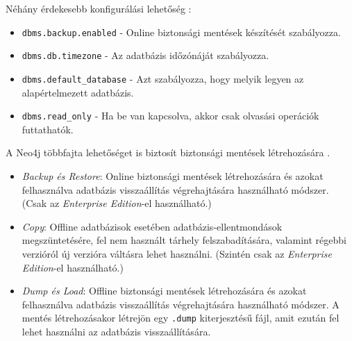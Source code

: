 Néhány érdekesebb konfigurálási lehetőség \cite{neo4j-config-settings}:
\begin{itemize}
    \item \texttt{dbms.backup.enabled} - Online biztonsági mentések készítését szabályozza.
    \item \texttt{dbms.db.timezone} - Az adatbázis időzónáját szabályozza.
    \item \texttt{dbms.default\_database} - Azt szabályozza, hogy melyik legyen az alapértelmezett adatbázis.
    \item \texttt{dbms.read\_only} - Ha be van kapcsolva, akkor csak olvasási operációk futtathatók.
\end{itemize}


A Neo4j többfajta lehetőséget is biztosít biztonsági mentések létrehozására \cite{neo4j-backup}.

\begin{itemize}
    \item \textit{Backup és Restore}: Online biztonsági mentések létrehozására és azokat felhasználva adatbázis visszaállítás végrehajtására használható módszer. (Csak az \textit{Enterprise Edition}-el használható.)
    \item \textit{Copy}: Offline adatbázisok esetében adatbázis-ellentmondások megszüntetésére, fel nem használt tárhely felszabadítására, valamint régebbi verzióról új verzióra váltásra lehet használni. (Szintén csak az \textit{Enterprise Edition}-el használható.)
    \item \textit{Dump és Load}: Offline biztonsági mentések létrehozására és azokat felhasználva adatbázis visszaállítás végrehajtására használható módszer. A mentés létrehozásakor létrejön egy \texttt{.dump} kiterjesztésű fájl, amit ezután fel lehet használni az adatbázis visszaállítására.
\end{itemize}